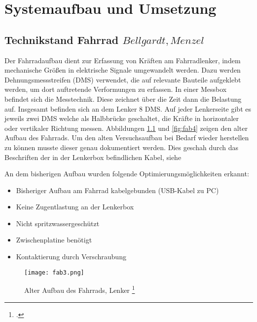\chapter{Systemaufbau und Umsetzung}

\section{Technikstand Fahrrad \(Bellgardt, Menzel\)}
\label{sec:technikstandfahrrad}
Der Fahrradaufbau dient zur Erfassung von Kräften am Fahrradlenker, indem mechanische Größen in elektrische Signale umgewandelt werden. Dazu werden Dehnungsmessstreifen (DMS) verwendet, die auf relevante Bauteile aufgeklebt werden, um dort auftretende Verformungen zu erfassen. In einer Messbox befindet sich die Messtechnik. Diese zeichnet über die Zeit dann die Belastung auf. Insgesamt befinden sich an dem Lenker 8 DMS. Auf jeder Lenkerseite gibt es jeweils zwei DMS welche als Halbbrücke geschaltet, die Kräfte in horizontaler oder vertikaler Richtung messen. 
Abbildungen \ref{fig:fab3} und \ref{fig:fab4} zeigen den alter Aufbau des Fahrrads.
Um den alten Versuchsaufbau bei Bedarf wieder herstellen zu können musste dieser genau dokumentiert werden.
Dies geschah durch das Beschriften der in der Lenkerbox befindlichen Kabel, siehe 


An dem bisherigen Aufbau wurden folgende Optimierungsmöglichkeiten erkannt:
\begin{itemize}
    \item Bisheriger Aufbau am Fahrrad kabelgebunden (USB-Kabel zu PC)
    \item Keine Zugentlastung an der Lenkerbox
    \item Nicht spritzwassergeschützt
    \item Zwischenplatine benötigt
    \item Kontaktierung durch Verschraubung
\end{itemize}

\begin{figure}[h]
    \begin{center}
        \texttt{[image: fab3.png]}
        \caption[Alter Aufbau des Fahrrads, Lenker (Abbildungsverzeichnis)]{Alter Aufbau des Fahrrads, Lenker
        \footcite{Rechter Teil des Bildes: Praktikum Schwingbruchgefaehrdete Bauteile sicher dimensionieren und betreiben
        }
        }
        \label{fig:fab3}
    \end{center}
\end{figure}



